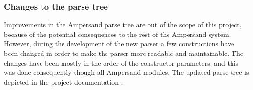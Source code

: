 \subsubsection{Changes to the parse tree}
\label{design:parse-tree}
Improvements in the Ampersand parse tree are out of the scope of this project, because of the potential consequences to the rest of the Ampersand system.
However, during the development of the new parser a few constructions have been changed in order to make the parser more readable and maintainable.
The changes have been mostly in the order of the constructor parameters, and this was done consequently though all Ampersand modules.
The updated parse tree is depicted in the project documentation .
